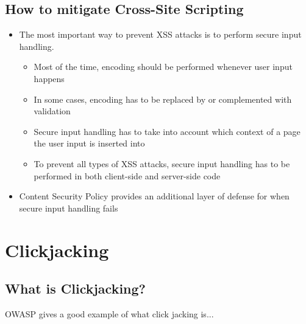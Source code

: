 \documentclass[a4paper, titlepage]{article}
\begin{document}
\subsection{How to mitigate Cross-Site Scripting}
\begin{itemize}
    \item The most important way to prevent XSS attacks is to perform secure input handling.
    \begin{itemize}
        \item Most of the time, encoding should be performed whenever user input happens
        \item In some cases, encoding has to be replaced by or complemented with validation
        \item Secure input handling has to take into account which context of a page the user input is inserted into
        \item To prevent all types of XSS attacks, secure input handling has to be performed in both client-side and server-side code
    \end{itemize}
\item Content Security Policy provides an additional layer of defense for when secure input handling fails
\end{itemize}
\newpage

\section{Clickjacking}
\subsection{What is Clickjacking?}
OWASP gives a good example of what click jacking is...


\newpage
\end{document}
